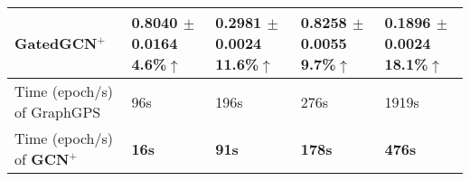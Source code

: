 \begin{table*}[t]
{\begin{tabular}{l|llll}
        \rowcolor{gray!20}
        \textbf{GatedGCN$^+$} & \textbf{\textcolor{customcyan}{0.8040{\tiny{ $\pm$ 0.0164}}}} \textbf{4.6\%$\uparrow$} & \textbf{\textcolor{customcyan}{0.2981{\tiny{ $\pm$ 0.0024}}}} \textbf{11.6\%$\uparrow$} & \textbf{\textcolor{customcyan}{0.8258{\tiny{ $\pm$ 0.0055}}}} \textbf{9.7\%$\uparrow$} & \textbf{\textcolor{darkorange!90}{0.1896{\tiny{ $\pm$ 0.0024}}}} \textbf{18.1\%$\uparrow$} \\ 
        \midrule %
        Time (epoch/s) of GraphGPS & 96s & 196s & 276s& 1919s \\
        \rowcolor{gray!20}
        Time (epoch/s) of  \textbf{GCN$^+$} & \textbf{16s} & \textbf{91s} & \textbf{178s} & \textbf{476s}  \\
        \bottomrule
    \end{tabular}}
    \vspace{-0.05 in}
	\label{tab:tab4}
\end{table*}

